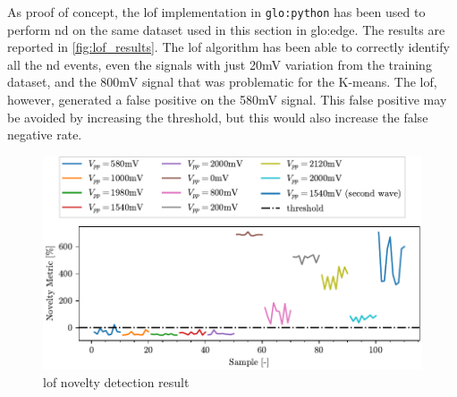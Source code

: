 As proof of concept, the \gls{lof} implementation in \texttt{\gls{glo:python}} has been used to perform \gls{nd} on the same dataset used in this section in \gls{glo:edge}. The results are reported in \autoref{fig:lof_results}. The \gls{lof} algorithm has been able to correctly identify all the \gls{nd} events, even the signals with just 20mV variation from the training dataset, and the 800mV signal that was problematic for the K-means. The \gls{lof}, however, generated a false positive on the 580mV signal. This false positive may be avoided by increasing the threshold, but this would also increase the false negative rate. 

\begin{figure}
    \centering
    \includegraphics{Images/shaker/Test02_LOF.pdf}
    \caption{\gls{lof} novelty detection result}
    \label{fig:lof_results}
\end{figure}